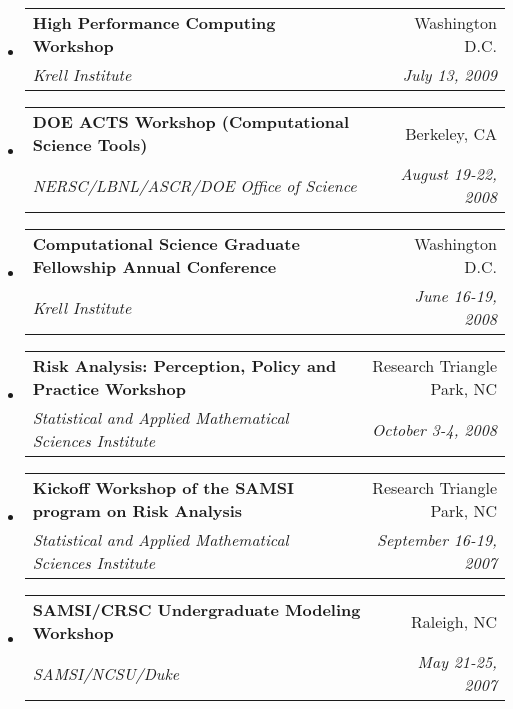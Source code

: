 \documentclass[letterpaper,11pt]{article}
\makeatletter
\newcommand{\ressubheading}[4]{
\begin{tabular*}{6.5in}{l@{\cftdotfill{\cftsecdotsep}\extracolsep{\fill}}r}
		\textbf{#1} & #2 \\
		\textit{#3} & \textit{#4} \\
\end{tabular*}\vspace{-6pt}}
\makeatother
\begin{document}
\begin{itemize}
\item
	\ressubheading{High Performance Computing Workshop}{Washington D.C.}{Krell Institute}{July 13, 2009}
\item
	\ressubheading{DOE ACTS Workshop (Computational Science Tools)}{Berkeley, CA}{NERSC/LBNL/ASCR/DOE Office of Science}{August 19-22, 2008}
\item
	\ressubheading{Computational Science Graduate Fellowship Annual Conference}{Washington D.C.}{Krell Institute}{June 16-19, 2008}
\item
	\ressubheading{Risk Analysis: Perception, Policy and Practice Workshop}{Research Triangle Park, NC}{Statistical and Applied Mathematical Sciences Institute}{October 3-4, 2008}
\item
	\ressubheading{Kickoff Workshop of the SAMSI program on Risk Analysis}{Research Triangle Park, NC}{Statistical and Applied Mathematical Sciences Institute}{September 16-19, 2007}
\item
	\ressubheading{SAMSI/CRSC Undergraduate Modeling Workshop}{Raleigh, NC}{SAMSI/NCSU/Duke}{May 21-25, 2007}
\end{itemize}

\pagebreak
\end{document}
